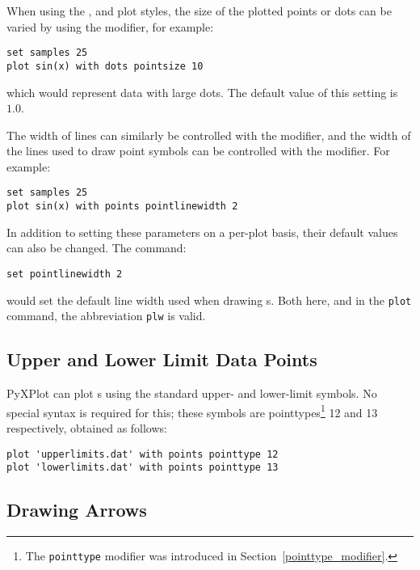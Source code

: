 When using the ,  and  plot
styles, the size of the plotted points or dots can be varied by using the
 modifier, for example:

\begin{verbatim}
set samples 25
plot sin(x) with dots pointsize 10
\end{verbatim}

which would represent data with large dots. The default value of this setting
is $1.0$.

\noindent The width of lines can similarly be controlled with the
 modifier, and the width of the lines used to draw point
symbols can be controlled with the  modifier. For
example:

\begin{verbatim}
set samples 25
plot sin(x) with points pointlinewidth 2
\end{verbatim}

\noindent In addition to setting these parameters on a per-plot basis, their
default values can also be changed. The command:

\begin{verbatim}
set pointlinewidth 2
\end{verbatim}

\noindent would set the default line width used when drawing \datapoint s. Both
here, and in the {\tt plot} command, the abbreviation {\tt plw} is valid. 

\subsection{Upper and Lower Limit Data Points}

PyXPlot can plot \datapoint s using the standard upper- and lower-limit
symbols. No special
syntax is required for this; these symbols are pointtypes\footnote{The
{\tt pointtype} modifier was introduced in
Section~\ref{pointtype_modifier}.} 12 and 13 respectively, obtained as follows:

\begin{verbatim}
plot 'upperlimits.dat' with points pointtype 12
plot 'lowerlimits.dat' with points pointtype 13
\end{verbatim}

\subsection{Drawing Arrows}
\label{arrows_plot_style} 

